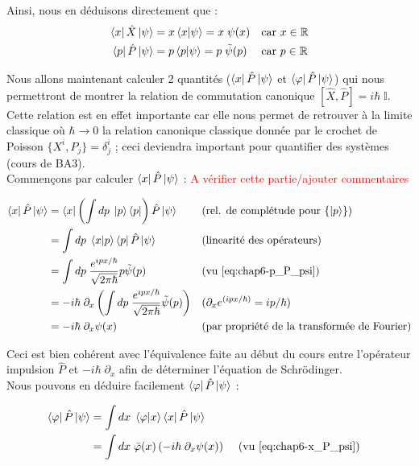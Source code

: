 \documentclass[../notesdecours]{subfiles}
\begin{document}
Ainsi, nous en déduisons directement que : 
\begin{align}
    \bra{x}\hat{X}\ket{\psi} &= x \braket{x|\psi} = x \; \psi(x)  && \text{car $x\in \mathbb{R}$} \notag\\
	\bra{p}\hat{P}\ket{\psi} &= p \braket{p|\psi} = p \; \tilde{\psi}(p) && \text{car $p\in \mathbb{R}$} \label{eq:chap6-p_P_psi}
\end{align}

Nous allons maintenant calculer 2 quantités ($\bra{x}\hat{P}\ket{\psi}$ et $\bra{\varphi} \hat{P} \ket{\psi}$) qui nous permettront de montrer la relation de commutation canonique $[ \hat{X}, \hat{P}] = i\hbar \; \mathbb{I}$. Cette relation est en effet importante car elle nous permet de retrouver à la limite classique où $\hbar \rightarrow 0$ la relation canonique classique donnée par le crochet de Poisson $\{ X^i,P_j \} = \delta^i_j$ ; ceci deviendra important pour quantifier des systèmes (cours de BA3). \\
Commençons par calculer $\bra{x}\hat{P}\ket{\psi}$ : \textcolor{red}{A vérifier cette partie/ajouter commentaires}

\begin{align}
	\bra{x}\hat{P}\ket{\psi} &= \bra{x} \left( \int dp \; \ket{p} \bra{p} \right) \hat{P} \ket{\psi} && (\text{rel. de complétude pour $\{\ket p\}$}) \notag\\
	&= \int dp \; \braket{x|p} \bra{p}\hat{P}\ket{\psi} && \text{(linearité des opérateurs)} \notag\\
	&= \int dp \; \frac{e^{ipx/\hbar}}{\sqrt{2\pi \hbar}} p \tilde{\psi}(p) && \text{(vu \eqref{eq:chap6-p_P_psi})} \notag\\
	&= -i \hbar \; \partial_x \left(\int dp \; \frac{e^{ipx/\hbar}}{\sqrt{2 \pi \hbar}} \tilde{\psi}(p) \right) && (\partial_x e^{(ipx/\hbar)}= ip/\hbar)\notag\\
	&= -i \hbar \; \partial_x \psi(x) && \text{(par propriété de la transformée de Fourier)} \label{eq:chap6-x_P_psi}
\end{align}

Ceci est bien cohérent avec l'équivalence faite au début du cours entre l'opérateur impulsion $\hat{P}$ et $-i\hbar \; \partial_x$ afin de déterminer l'équation de Schrödinger. \\
Nous pouvons en déduire facilement $\bra{\varphi} \hat{P} \ket{\psi}$ : 

\begin{align*}
    \bra{\varphi} \hat{P} \ket{\psi} &= \int dx \; \braket{\varphi | x} \bra{x} \hat{P} \ket{\psi} \notag \\
	&= \int dx \; \bar\varphi(x) \left( -i\hbar \; \partial_x \psi(x) \right) && \text{ (vu \eqref{eq:chap6-x_P_psi})} 
\end{align*}
\end{document}

